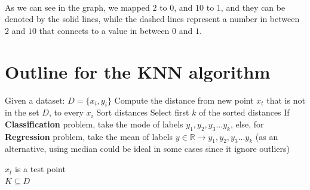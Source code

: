 \begin{outline}[enumerate]
\begin{center}
 \\
\end{center}

As we can see in the graph, we mapped $2$ to $0$, and $10$ to $1$, and they can be denoted by the solid lines,
while the dashed lines represent a number in between $2$ and $10$ that connects to a value in between $0$ and $1$.

\end{outline}


\section{Outline for the KNN algorithm}
\begin{outline}

    \1  Given a dataset: $D=\{x_i,y_i\}$
    \1  Compute the distance from new point $x_t$ that is not in the set $D$, to every $x_i$
    \1  Sort distances
    \1  Select first $k$ of the sorted distances
    \1  If \textbf{Classification} problem, take the mode of labels $y_1, y_2, y_3 ... y_k$, else, for \textbf{Regression}
        problem, take the mean of labels $y \in \mathbb{R} \rightarrow y_1, y_2, y_3 ... y_k$ (as an alternative, using median could be
        ideal in some cases since it ignore outliers)
\end{outline}

$x_t$ is a test point\\

$K \subseteq D$ \\

